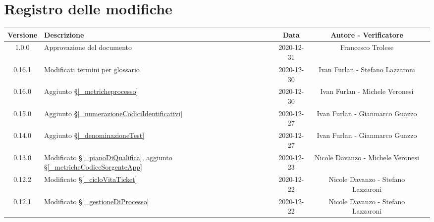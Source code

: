 \section*{Registro delle modifiche}

\begin{center}
	\begin{longtable}{|c|p{5cm}|c|c|c|}
		\hline
		\rowcolor{lighter-grayer}
		\textbf{Versione} & \textbf{Descrizione} & \textbf{Data} & \textbf{Autore - Verificatore} \\
		\hline
		\endfirsthead

		1.0.0 & Approvazione del documento & 2020-12-31 & Francesco Trolese \\
		0.16.1 & Modificati termini per glossario & 2020-12-30 & Ivan Furlan - Stefano Lazzaroni \\
		0.16.0 & Aggiunto \S\ref{_metricheprocesso} & 2020-12-30 & Ivan Furlan - Michele Veronesi \\
		0.15.0 & Aggiunto \S\ref{_numerazioneCodiciIdentificativi} & 2020-12-27 & Ivan Furlan - Gianmarco Guazzo \\
		0.14.0 & Aggiunto \S\ref{_denominazioneTest} & 2020-12-27 & Ivan Furlan - Gianmarco Guazzo  \\
		0.13.0 & Modificato \S\ref{_pianoDiQualifica}, aggiunto \S\ref{_metricheCodiceSorgenteApp} & 2020-12-23 & Nicole Davanzo - Michele Veronesi  \\
		
		0.12.2 & Modificato \S\ref{_cicloVitaTicket} & 2020-12-22& Nicole Davanzo - Stefano Lazzaroni  \\
		0.12.1 & Modificato \S\ref{_gestioneDiProcesso} & 2020-12-22 & Nicole Davanzo - Stefano Lazzaroni  \\


\end{longtable}
\end{center}
